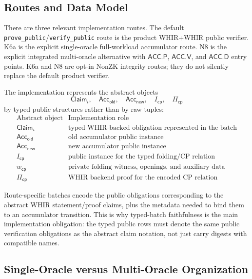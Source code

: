 \documentclass[11pt]{article}
\theoremstyle{definition}
\newcommand{\Acc}{\mathsf{Acc}}
\begin{document}
\subsection{Routes and Data Model}
\label{sec:routes-and-data-model}

There are three relevant implementation routes. The default
\texttt{prove\_public}/\texttt{verify\_public} route is the product WHIR+WHIR
public verifier. K6a is the explicit single-oracle full-workload accumulator
route. N8 is the explicit integrated multi-oracle alternative with
\(\mathsf{ACC.P}\), \(\mathsf{ACC.V}\), and \(\mathsf{ACC.D}\) entry points. K6a
and N8 are opt-in NonZK integrity routes; they do not silently replace the
default product verifier.

The implementation represents the abstract objects
\[
  \mathsf{Claim}_i,\quad
  \Acc_{\mathsf{old}},\quad
  \Acc_{\mathsf{new}},\quad
  I_{\mathsf{cp}},\quad
  \Pi_{\mathsf{cp}}
\]
by typed public structures rather than by raw tuples:
\[
\begin{array}{c|c}
\text{Abstract object} & \text{Implementation role} \\
\hline
\mathsf{Claim}_i & \text{typed WHIR-backed obligation represented in the batch} \\
\Acc_{\mathsf{old}} & \text{old accumulator public instance} \\
\Acc_{\mathsf{new}} & \text{new accumulator public instance} \\
I_{\mathsf{cp}} & \text{public instance for the typed folding/CP relation} \\
w_{\mathsf{cp}} & \text{private folding witness, openings, and auxiliary data} \\
\Pi_{\mathsf{cp}} & \text{WHIR backend proof for the encoded CP relation}
\end{array}
\]

Route-specific batches encode the public obligations corresponding to the
abstract WHIR statement/proof claims, plus the metadata needed to bind them to an
accumulator transition. This is why typed-batch faithfulness is the main
implementation obligation: the typed public rows must denote the same public
verification obligations as the abstract claim notation, not just carry digests
with compatible names.

\subsection{Single-Oracle versus Multi-Oracle Organization}
\label{sec:single-vs-multi-oracle}
\end{document}
